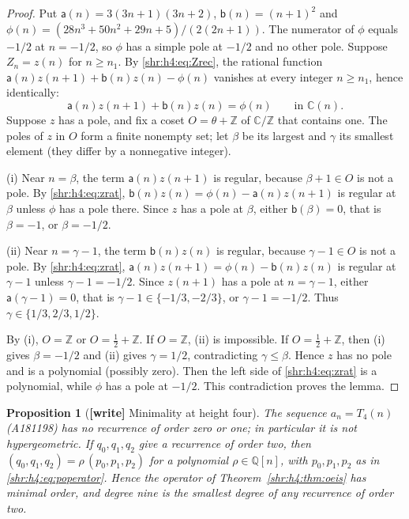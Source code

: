 \documentclass[11pt,letterpaper]{article}
\numberwithin{equation}{section}
\newtheorem{proposition}[theorem]{Proposition}
\theoremstyle{definition}
\newcommand{\Q}{\mathbb Q}
\newcommand{\1}{\mathbf 1}
\newcommand{\Z}{\mathbb Z}
\begin{document}
\begin{proof}
Put $\mathsf a(n)=3(3n+1)(3n+2)$, $\mathsf b(n)=(n+1)^2$ and
$\phi(n)=(28n^3+50n^2+29n+5)/(2(2n+1))$. The numerator of $\phi$ equals
$-1/2$ at $n=-1/2$, so $\phi$ has a simple pole at $-1/2$ and no other
pole. Suppose $Z_n=z(n)$ for $n\ge n_1$. By \eqref{shr:h4:eq:Zrec}, the
rational function $\mathsf a(n)z(n+1)+\mathsf b(n)z(n)-\phi(n)$ vanishes at
every integer $n\ge n_1$, hence identically:
\begin{equation}
 \mathsf a(n)z(n+1)+\mathsf b(n)z(n)=\phi(n)\qquad\text{in }\mathbb C(n).
 \label{shr:h4:eq:zrat}
\end{equation}
Suppose $z$ has a pole, and fix a coset $O=\theta+\Z$ of $\mathbb C/\Z$
that contains one. The poles of $z$ in $O$ form a finite nonempty set; let
$\beta$ be its largest and $\gamma$ its smallest element (they differ by a
nonnegative integer).

(i) Near $n=\beta$, the term $\mathsf a(n)z(n+1)$ is regular, because
$\beta+1\in O$ is not a pole. By \eqref{shr:h4:eq:zrat},
$\mathsf b(n)z(n)=\phi(n)-\mathsf a(n)z(n+1)$ is regular at $\beta$ unless
$\phi$ has a pole there. Since $z$ has a pole at $\beta$, either
$\mathsf b(\beta)=0$, that is $\beta=-1$, or $\beta=-1/2$.

(ii) Near $n=\gamma-1$, the term $\mathsf b(n)z(n)$ is regular, because
$\gamma-1\in O$ is not a pole. By \eqref{shr:h4:eq:zrat},
$\mathsf a(n)z(n+1)=\phi(n)-\mathsf b(n)z(n)$ is regular at $\gamma-1$
unless $\gamma-1=-1/2$. Since $z(n+1)$ has a pole at $n=\gamma-1$, either
$\mathsf a(\gamma-1)=0$, that is $\gamma-1\in\{-1/3,-2/3\}$, or
$\gamma-1=-1/2$. Thus $\gamma\in\{1/3,2/3,1/2\}$.

By (i), $O=\Z$ or $O=\tfrac12+\Z$. If $O=\Z$, (ii) is impossible. If
$O=\tfrac12+\Z$, then (i) gives $\beta=-1/2$ and (ii) gives $\gamma=1/2$,
contradicting $\gamma\le\beta$. Hence $z$ has no pole and is a polynomial
(possibly zero). Then the left side of \eqref{shr:h4:eq:zrat} is a
polynomial, while $\phi$ has a pole at $-1/2$. This contradiction proves
the lemma.
\end{proof}

\begin{proposition}[\textbf{[write]} Minimality at height four]
\label{shr:h4:prop:minimal}
The sequence $a_n=T_4(n)$ (A181198) has no recurrence of order zero or
one; in particular it is not hypergeometric. If $q_0,q_1,q_2$ give a
recurrence of order two, then $(q_0,q_1,q_2)=\rho\,(p_0,p_1,p_2)$ for a
polynomial $\rho\in\Q[n]$, with $p_0,p_1,p_2$ as in \eqref{shr:h4:eq:poperator}.
Hence the operator of Theorem~\ref{shr:h4:thm:oeis} has minimal order, and
degree nine is the smallest degree of any recurrence of order two.
\end{proposition}
\end{document}
